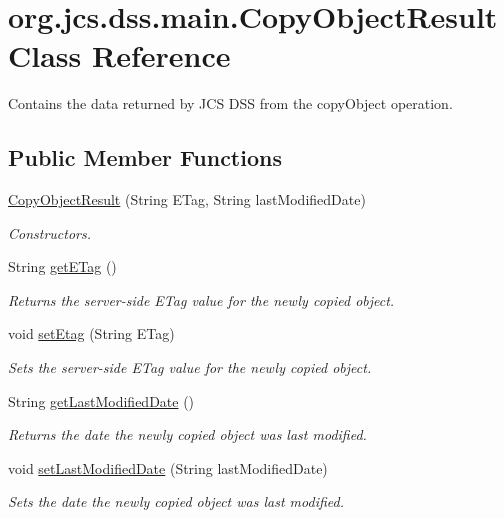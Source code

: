 \hypertarget{classorg_1_1jcs_1_1dss_1_1main_1_1CopyObjectResult}{}\section{org.\+jcs.\+dss.\+main.\+Copy\+Object\+Result Class Reference}
\label{classorg_1_1jcs_1_1dss_1_1main_1_1CopyObjectResult}


Contains the data returned by J\+CS D\+SS from the copy\+Object operation.  


\subsection*{Public Member Functions}
\begin{DoxyCompactItemize}
\item 
\hyperlink{classorg_1_1jcs_1_1dss_1_1main_1_1CopyObjectResult_a32f636a22bd50d9337c43a5b2953e737}{Copy\+Object\+Result} (String E\+Tag, String last\+Modified\+Date)\hypertarget{classorg_1_1jcs_1_1dss_1_1main_1_1CopyObjectResult_a32f636a22bd50d9337c43a5b2953e737}{}\label{classorg_1_1jcs_1_1dss_1_1main_1_1CopyObjectResult_a32f636a22bd50d9337c43a5b2953e737}

\begin{DoxyCompactList}\small\item\em Constructors. \end{DoxyCompactList}\item 
String \hyperlink{classorg_1_1jcs_1_1dss_1_1main_1_1CopyObjectResult_a2b9d16ad7da1d9970e83bc075bfcc6d2}{get\+E\+Tag} ()
\begin{DoxyCompactList}\small\item\em Returns the server-\/side E\+Tag value for the newly copied object. \end{DoxyCompactList}\item 
void \hyperlink{classorg_1_1jcs_1_1dss_1_1main_1_1CopyObjectResult_abe430a8ad400731d8ede5cb223d8c51f}{set\+Etag} (String E\+Tag)
\begin{DoxyCompactList}\small\item\em Sets the server-\/side E\+Tag value for the newly copied object. \end{DoxyCompactList}\item 
String \hyperlink{classorg_1_1jcs_1_1dss_1_1main_1_1CopyObjectResult_a2bd81d44e3251ff52b3cb616c40f893e}{get\+Last\+Modified\+Date} ()
\begin{DoxyCompactList}\small\item\em Returns the date the newly copied object was last modified. \end{DoxyCompactList}\item 
void \hyperlink{classorg_1_1jcs_1_1dss_1_1main_1_1CopyObjectResult_a3bd07841878692c5c5b4922c6a7b23ec}{set\+Last\+Modified\+Date} (String last\+Modified\+Date)
\begin{DoxyCompactList}\small\item\em Sets the date the newly copied object was last modified. \end{DoxyCompactList}\end{DoxyCompactItemize}


